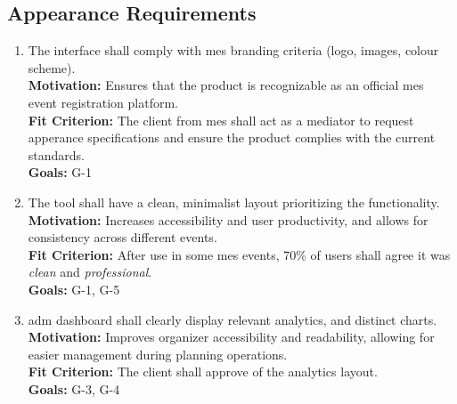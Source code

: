 \documentclass[12pt]{article}
\begin{document}
\subsection{Appearance Requirements}
\begin{enumerate}[label=\bfseries AR-\arabic*:, wide=0pt, leftmargin=*, 
  ref=\bfseries AR-\arabic*]
  \item \label{AR1} The interface shall comply with \Gls{mes} branding criteria (logo, images, colour scheme).\\[2mm]
    {\bf Motivation:} Ensures that the product is recognizable as an official \Gls{mes} event registration platform.\\
    {\bf Fit Criterion:} The client from \Gls{mes} shall act as a mediator to request apperance specifications and ensure the product complies with the current standards.\\
    {\bf Goals:} G-1
  \item \label{AR2} The tool shall have a clean, minimalist layout prioritizing the functionality.\\[2mm]
    {\bf Motivation:} Increases accessibility and user productivity, and allows for consistency across different events.\\
    {\bf Fit Criterion:} After use in some \Gls{mes} events, 70\% of users shall agree it was \textit{clean} and \textit{professional}.\\
    {\bf Goals:} G-1, G-5
  \item \label{AR3} \Gls{adm} dashboard shall clearly display relevant analytics, and distinct charts.\\[2mm]
    {\bf Motivation:} Improves organizer accessibility and readability, allowing for easier management during planning operations.\\
    {\bf Fit Criterion:} The client shall approve of the analytics layout.\\
    {\bf Goals:} G-3, G-4
\end{enumerate}
\end{document}
